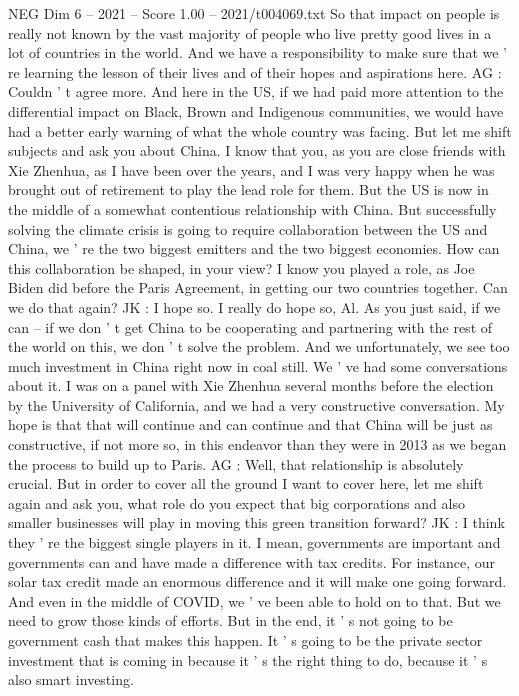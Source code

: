 \begin{textsample}{NEG Dim 6 – 2021 – Score 1.00 – 2021/t004069.txt}
So that impact on people is really not known by the vast majority of people who live pretty good lives in a lot of countries in the world.
And we have a responsibility to make sure that we ' re learning the lesson of their lives and of their hopes and aspirations here.
AG : Couldn ' t agree more.
And here in the US, if we had paid more attention to the differential impact on Black, Brown and Indigenous communities, we would have had a better early warning of what the whole country was facing.
But let me shift subjects and ask you about China.
I know that you, as you are close friends with Xie Zhenhua, as I have been over the years, and I was very happy when he was brought out of retirement to play the lead role for them.
But the US is now in the middle of a somewhat contentious relationship with China.
But successfully solving the climate crisis is going to require collaboration between the US and China, we ' re the two biggest emitters and the two biggest economies.
How can this collaboration be shaped, in your view?
I know you played a role, as Joe Biden did before the Paris Agreement, in getting our two countries together.
Can we do that again?
JK : I hope so.
I really do hope so, Al.
As you just said, if we can -- if we don ' t get China to be cooperating and partnering with the rest of the world on this, we don ' t solve the problem.
And we unfortunately, we see too much investment in China right now in coal still.
We ' ve had some conversations about it.
I was on a panel with Xie Zhenhua several months before the election by the University of California, and we had a very constructive conversation.
My hope is that that will continue and can continue and that China will be just as constructive, if not more so, in this endeavor than they were in 2013 as we began the process to build up to Paris.
AG : Well, that relationship is absolutely crucial.
But in order to cover all the ground I want to cover here, let me shift again and ask you, what role do you expect that big corporations and also smaller businesses will play in moving this green transition forward?
JK : I think they ' re the biggest single players in it.
I mean, governments are important and governments can and have made a difference with tax credits.
For instance, our solar tax credit made an enormous difference and it will make one going forward.
And even in the middle of COVID, we ' ve been able to hold on to that.
But we need to grow those kinds of efforts.
But in the end, it ' s not going to be government cash that makes this happen.
It ' s going to be the private sector investment that is coming in because it ' s the right thing to do, because it ' s also smart investing.

\end{textsample}
